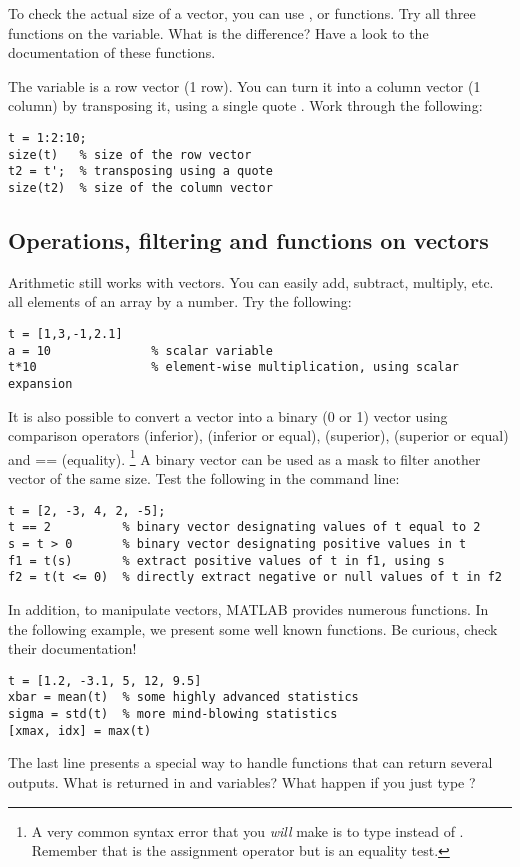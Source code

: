 \documentclass{article}
\begin{document}
To check the actual size of a vector, you can use ,  or  functions.
Try all three functions on the  variable. What is the difference?
Have a look to the documentation of these functions.

The variable  is a row vector (1 row).
You can turn it into a column vector (1 column) by transposing it, using a single quote .
Work through the following:
\begin{lstlisting}
t = 1:2:10;
size(t)   % size of the row vector
t2 = t';  % transposing using a quote
size(t2)  % size of the column vector
\end{lstlisting}

\subsection*{Operations, filtering and functions on vectors}

Arithmetic still works with vectors.
You can easily add, subtract, multiply, etc. all elements of an array by a number.
Try the following:
\begin{lstlisting}
t = [1,3,-1,2.1]
a = 10              % scalar variable
t*10                % element-wise multiplication, using scalar expansion
\end{lstlisting}

It is also possible to convert a vector into a binary (0 or 1) vector using comparison operators \mcode{<} (inferior), \mcode{<=} (inferior or equal), \mcode{>} (superior), \mcode{>=} (superior or equal) and {==} (equality).%
\footnote{%
  A very common syntax error that you \emph{will} make is to type  instead of .
  Remember that \mcode{=} is the assignment operator but \mcode{==} is an equality test.
}
A binary vector can be used as a mask to filter another vector of the same size.
Test the following in the command line:
\begin{lstlisting}
t = [2, -3, 4, 2, -5];
t == 2          % binary vector designating values of t equal to 2
s = t > 0       % binary vector designating positive values in t
f1 = t(s)       % extract positive values of t in f1, using s
f2 = t(t <= 0)  % directly extract negative or null values of t in f2
\end{lstlisting}

In addition, to manipulate vectors, MATLAB provides numerous functions.
In the following example, we present some well known functions.
Be curious, check their documentation!
\begin{lstlisting}
t = [1.2, -3.1, 5, 12, 9.5]
xbar = mean(t)  % some highly advanced statistics
sigma = std(t)  % more mind-blowing statistics
[xmax, idx] = max(t)
\end{lstlisting}
The last line presents a special way to handle functions that can return several outputs.
What is returned in  and  variables?
What happen if you just type ?
\end{document}
